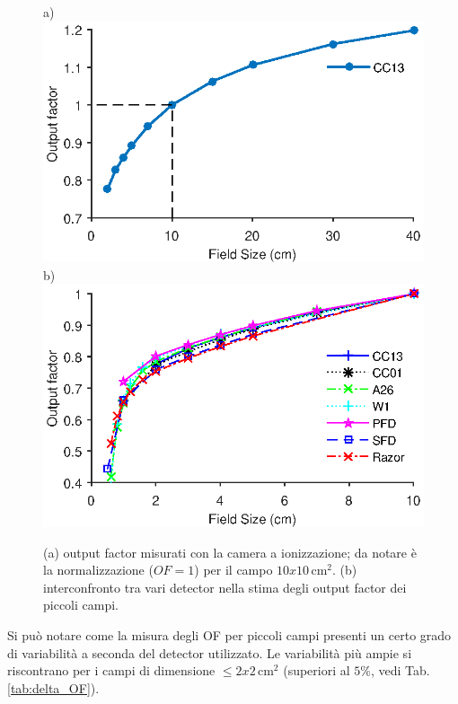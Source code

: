 \begin{figure}[!t]
\centering
a)\includegraphics[width=.8\textwidth]{./cap2/OF_plots/OFCC13.eps}\\
b)\includegraphics[width=.8\textwidth]{./cap2/OF_plots/OFSmall.eps}
\caption{(a) output factor misurati con la camera a ionizzazione; da notare è la normalizzazione ($OF=1$) per il campo $10x10\,$cm$^2$. (b) interconfronto tra vari detector nella stima degli output factor dei piccoli campi.}
\label{fig:OF_res}
\end{figure}
Si può notare come la misura degli OF per piccoli campi presenti un certo grado di variabilità a seconda del detector utilizzato. Le variabilità più ampie si riscontrano per i campi di dimensione $\leq 2x2\,$cm$^2$ (superiori al $5\%$, vedi Tab.\ref{tab:delta_OF}). 

